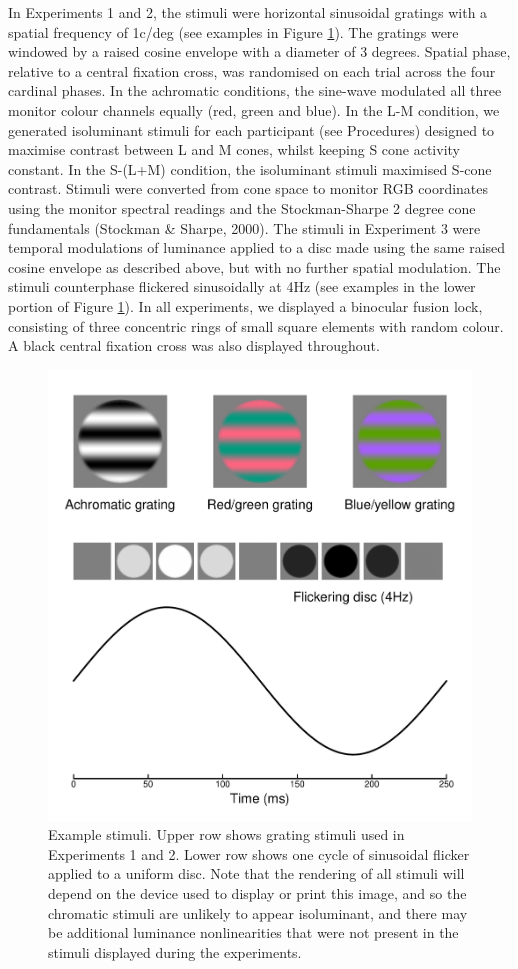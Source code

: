 \documentclass[
]{article}
\begin{document}
In Experiments 1 and 2, the stimuli were horizontal sinusoidal gratings with a spatial frequency of 1c/deg (see examples in Figure \ref{fig:examplestim}). The gratings were windowed by a raised cosine envelope with a diameter of 3 degrees. Spatial phase, relative to a central fixation cross, was randomised on each trial across the four cardinal phases. In the achromatic conditions, the sine-wave modulated all three monitor colour channels equally (red, green and blue). In the L-M condition, we generated isoluminant stimuli for each participant (see Procedures) designed to maximise contrast between L and M cones, whilst keeping S cone activity constant. In the S-(L+M) condition, the isoluminant stimuli maximised S-cone contrast. Stimuli were converted from cone space to monitor RGB coordinates using the monitor spectral readings and the Stockman-Sharpe 2 degree cone fundamentals (Stockman \& Sharpe, 2000). The stimuli in Experiment 3 were temporal modulations of luminance applied to a disc made using the same raised cosine envelope as described above, but with no further spatial modulation. The stimuli counterphase flickered sinusoidally at 4Hz (see examples in the lower portion of Figure \ref{fig:examplestim}). In all experiments, we displayed a binocular fusion lock, consisting of three concentric rings of small square elements with random colour. A black central fixation cross was also displayed throughout.

\begin{figure}

{\centering \includegraphics[width=0.5\linewidth]{Figures/examplestim} 

}

\caption{Example stimuli. Upper row shows grating stimuli used in Experiments 1 and 2. Lower row shows one cycle of sinusoidal flicker applied to a uniform disc. Note that the rendering of all stimuli will depend on the device used to display or print this image, and so the chromatic stimuli are unlikely to appear isoluminant, and there may be additional luminance nonlinearities that were not present in the stimuli displayed during the experiments.}\label{fig:examplestim}
\end{figure}
\end{document}
